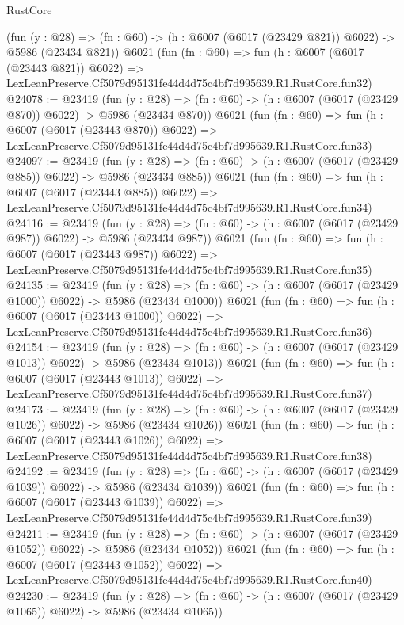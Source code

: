 \begin{lexlean}{RustCore}
\begin{coremodule}
    (fun (y : @28) => (fn : @60) -> (h : @6007 (@6017 (@23429 @821)) @6022) -> @5986 (@23434 @821))
    @6021
    (fun (fn : @60) =>
    fun (h : @6007 (@6017 (@23443 @821)) @6022) =>
    LexLeanPreserve.Cf5079d95131fe44d4d75c4bf7d995639.R1.RustCore.fun32)
@24078 := @23419
    (fun (y : @28) => (fn : @60) -> (h : @6007 (@6017 (@23429 @870)) @6022) -> @5986 (@23434 @870))
    @6021
    (fun (fn : @60) =>
    fun (h : @6007 (@6017 (@23443 @870)) @6022) =>
    LexLeanPreserve.Cf5079d95131fe44d4d75c4bf7d995639.R1.RustCore.fun33)
@24097 := @23419
    (fun (y : @28) => (fn : @60) -> (h : @6007 (@6017 (@23429 @885)) @6022) -> @5986 (@23434 @885))
    @6021
    (fun (fn : @60) =>
    fun (h : @6007 (@6017 (@23443 @885)) @6022) =>
    LexLeanPreserve.Cf5079d95131fe44d4d75c4bf7d995639.R1.RustCore.fun34)
@24116 := @23419
    (fun (y : @28) => (fn : @60) -> (h : @6007 (@6017 (@23429 @987)) @6022) -> @5986 (@23434 @987))
    @6021
    (fun (fn : @60) =>
    fun (h : @6007 (@6017 (@23443 @987)) @6022) =>
    LexLeanPreserve.Cf5079d95131fe44d4d75c4bf7d995639.R1.RustCore.fun35)
@24135 := @23419
    (fun (y : @28) =>
    (fn : @60) -> (h : @6007 (@6017 (@23429 @1000)) @6022) -> @5986 (@23434 @1000))
    @6021
    (fun (fn : @60) =>
    fun (h : @6007 (@6017 (@23443 @1000)) @6022) =>
    LexLeanPreserve.Cf5079d95131fe44d4d75c4bf7d995639.R1.RustCore.fun36)
@24154 := @23419
    (fun (y : @28) =>
    (fn : @60) -> (h : @6007 (@6017 (@23429 @1013)) @6022) -> @5986 (@23434 @1013))
    @6021
    (fun (fn : @60) =>
    fun (h : @6007 (@6017 (@23443 @1013)) @6022) =>
    LexLeanPreserve.Cf5079d95131fe44d4d75c4bf7d995639.R1.RustCore.fun37)
@24173 := @23419
    (fun (y : @28) =>
    (fn : @60) -> (h : @6007 (@6017 (@23429 @1026)) @6022) -> @5986 (@23434 @1026))
    @6021
    (fun (fn : @60) =>
    fun (h : @6007 (@6017 (@23443 @1026)) @6022) =>
    LexLeanPreserve.Cf5079d95131fe44d4d75c4bf7d995639.R1.RustCore.fun38)
@24192 := @23419
    (fun (y : @28) =>
    (fn : @60) -> (h : @6007 (@6017 (@23429 @1039)) @6022) -> @5986 (@23434 @1039))
    @6021
    (fun (fn : @60) =>
    fun (h : @6007 (@6017 (@23443 @1039)) @6022) =>
    LexLeanPreserve.Cf5079d95131fe44d4d75c4bf7d995639.R1.RustCore.fun39)
@24211 := @23419
    (fun (y : @28) =>
    (fn : @60) -> (h : @6007 (@6017 (@23429 @1052)) @6022) -> @5986 (@23434 @1052))
    @6021
    (fun (fn : @60) =>
    fun (h : @6007 (@6017 (@23443 @1052)) @6022) =>
    LexLeanPreserve.Cf5079d95131fe44d4d75c4bf7d995639.R1.RustCore.fun40)
@24230 := @23419
    (fun (y : @28) =>
    (fn : @60) -> (h : @6007 (@6017 (@23429 @1065)) @6022) -> @5986 (@23434 @1065))

\end{coremodule}
\end{lexlean}

